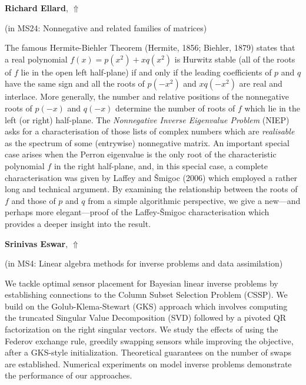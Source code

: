 \documentclass[ILAS2025-program.tex]{subfiles}
\begin{document}
\hypertarget{down0197}{}\begin{ilasabstract}
    
\textbf{Richard Ellard},  \hfill \hyperlink{up0197}{$\Uparrow$}
    
    
(in {\color{mstitle}MS24: Nonnegative and related families of matrices})
        
\mtskip
    The famous Hermite-Biehler Theorem (Hermite, 1856; Biehler, 1879) states that a real polynomial $f(x)=p(x^2)+xq(x^2)$ is Hurwitz stable (all of the roots of $f$ lie in the open left half-plane) if and only if the leading coefficients of $p$ and $q$ have the same sign and all the roots of $p(-x^2)$ and $xq(-x^2)$ are real and interlace. More generally, the number and relative positions of the nonnegative roots of $p(-x)$ and $q(-x)$ determine the number of roots of $f$ which lie in the left (or right) half-plane. The \emph{Nonnegative Inverse Eigenvalue Problem} (NIEP) asks for a characterisation of those lists of complex numbers which are \emph{realisable} as the spectrum of some (entrywise) nonnegative matrix. An important special case arises when the Perron eigenvalue is the only root of the characteristic polynomial $f$ in the right half-plane, and, in this special case, a complete characterisation was given by Laffey and \v{S}migoc (2006) which employed a rather long and technical argument. By examining the relationship between the roots of $f$ and those of $p$ and $q$ from a simple algorithmic perspective, we give a new---and perhaps more elegant---proof of the Laffey-\v{S}migoc characterisation which provides a deeper insight into the result.

\end{ilasabstract}
    

\hypertarget{down0355}{}\begin{ilasabstract}
    
\textbf{Srinivas Eswar},  \hfill \hyperlink{up0355}{$\Uparrow$}
    
    
(in {\color{mstitle}MS4: Linear algebra methods for inverse problems and data assimilation})
        
\mtskip
    We tackle optimal sensor placement for Bayesian linear inverse problems by establishing connections to the Column Subset Selection Problem (CSSP). We build on the Golub-Klema-Stewart (GKS) approach which involves computing the truncated Singular Value Decomposition (SVD) followed by a pivoted QR factorization on the right singular vectors. We study the effects of using the Federov exchange rule, greedily swapping sensors while improving the objective, after a GKS-style initialization. Theoretical guarantees on the number of swaps are established. Numerical experiments on model inverse problems demonstrate the performance of our approaches.

\end{ilasabstract}
    
\end{document}
